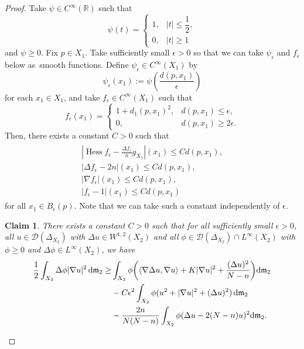 \documentclass[10pt,a4paper]{amsart}
\numberwithin{equation}{section}
\newtheorem{Clm}[Thm]{Claim}
\theoremstyle{definition}
\newcommand{\Hess}{\operatorname{Hess}}
\newcommand{\R}{\mathbb{R}}
\newcommand{\mf}{\mathfrak{m}}
\newcommand{\D}{\mathcal{D}}
\begin{document}
\begin{proof}
Take $\psi\in C^\infty(\R)$ such that
\[
\psi(t)=
\begin{cases}
1,& |t|\leq \dfrac{1}{2},
\\
0,& |t|\geq 1
\end{cases}
\]
and $\psi\geq 0$.
Fix $p\in X_1$.
Take sufficiently small $\epsilon>0$ so that we can take $\psi_\epsilon$ and $f_\epsilon$ below as~smooth functions.
Define $\psi_\epsilon \in C^\infty(X_1)$ by
\[
\psi_\epsilon (x_1):=\psi\left(\frac{d(p,x_1)}{\epsilon}\right)
\]
for each $x_1\in X_1$, and take $f_\epsilon\in C^\infty(X_1)$ such that
\[
f_\epsilon (x_1)=
\begin{cases}
1+d_1(p,x_1)^2,& d(p,x_1) \leq \epsilon,
\\
0,& d(p,x_1)\geq 2\epsilon.
\end{cases}
\]
Then, there exists a constant $C>0$ such that
\begin{gather}\label{hessf}
\begin{array}{l}
\left|\Hess f_\epsilon-\frac{\Delta f_\epsilon}{n}g_{X_1}\right|(x_1)\leq C d(p,x_1),
\\[1ex]
|\Delta f_\epsilon -2n|(x_1)\leq C d(p,x_1),
\\
|\nabla f_\epsilon|(x_1)\leq C d(p,x_1),
\\[1ex]
|f_\epsilon-1|(x_1)\leq C d(p,x_1)
\end{array}
\end{gather}
for all $x_1\in B_\epsilon(p)$.
Note that we can take such a constant independently of $\epsilon$.

\begin{Clm}\label{eper}
There exists a constant $C>0$ such that for all sufficiently small $\epsilon>0$, all $u\in\D(\Delta_{X_2})$ with $\Delta u\in W^{1,2}(X_2)$ and all $\phi\in\D(\Delta_{X_2})\cap L^\infty(X_2)$ with $\phi\geq0$ and $\Delta \phi\in L^\infty(X_2)$, we have
\begin{align*}
\frac{1}{2}\int_{X_2}\Delta \phi|\nabla u|^2 \,{\rm d}\mf_2
\geq &\int_{X_2} \phi\bigg(\langle\nabla \Delta u,\nabla u\rangle+K|\nabla u|^2+\frac{(\Delta u)^2}{N-n}\bigg){\rm d}\mf_2
\\
&{}-C\epsilon^2\int_{X_2} \phi (u^2+|\nabla u|^2+(\Delta u)^2)\,{\rm d}\mf_2
\\
&{}-\frac{2n}{N(N-n)}\int_{X_2}\phi(\Delta u-2(N-n)u)^2{\rm d}\mf_2.
\end{align*}
\end{Clm}


\end{proof}
\end{document}
